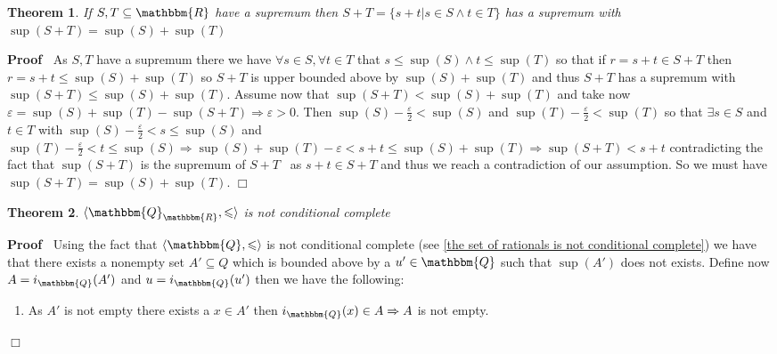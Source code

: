 \documentclass{book}
\newenvironment{proof}{\noindent\textbf{Proof\ }}{\hspace*{\fill}$\Box$\medskip}
\newtheorem{theorem}{Theorem}
\begin{document}
{{\begin{theorem}
  \label{sup(S+T)}If $S, T \subseteq \mathbbm{R}$ have a supremum then $S + T
  = \{ s + t|s \in S \wedge t \in T \}$ has a supremum with $\sup (S + T) =
  \sup (S) + \sup (T)$
\end{theorem}

\begin{proof}
  As $S, T$ have a supremum there we have $\forall s \in S, \forall t \in T$
  that $s \leqslant \sup (S) \wedge t \leqslant \sup (T)$ so that if $r = s +
  t \in S + T$ then $r = s + t \leqslant \sup (S) + \sup (T)$ so $S + T$ is
  upper bounded above by $\sup (S) + \sup (T)$ and thus $S + T$ has a supremum
  with $\sup (S + T) \leqslant \sup (S) + \sup (T)$. Assume now that $\sup (S
  + T) < \sup (S) + \sup (T)$ and take now $\varepsilon = \sup (S) + \sup (T)
  - \sup (S + T) \Rightarrow \varepsilon > 0$. Then $\sup (S) -
  \frac{\varepsilon}{2} < \sup (S)$ and $\sup (T) - \frac{\varepsilon}{2} <
  \sup (T)$ so that $\exists s \in S$ and $t \in T$ with $\sup (S) -
  \frac{\varepsilon}{2} < s \leqslant \sup (S)$ and $\sup (T) -
  \frac{\varepsilon}{2} < t \leqslant \sup (S) \Rightarrow \sup (S) + \sup (T)
  - \varepsilon < s + t \leqslant \sup (S) + \sup (T) \Rightarrow \sup (S + T)
  < s + t$ contradicting the fact that $\sup (S + T)$ is the supremum of $S +
  T$ \ as $s + t \in S + T$ and thus we reach a contradiction of our
  assumption. So we must have $\sup (S + T) = \sup (S) + \sup (T)$.
\end{proof}

\begin{theorem}
  \label{rationals embedded in the reals are not conditional complete}$\langle
  \mathbbm{Q}_{\mathbbm{R}}, \leqslant \rangle$ is not conditional complete
\end{theorem}

\begin{proof}
  Using the fact that $\langle \mathbbm{Q}, \leqslant \rangle$ is not
  conditional complete (see \ref{the set of rationals is not conditional
  complete}) we have that there exists a nonempty set $A' \subseteq Q$ which
  is bounded above by a $u' \in \mathbbm{Q}$ such that $\sup (A')$ does not
  exists. Define now $A = i_{\mathbbm{Q}} (A')$ and $u = i_{\mathbbm{Q}} (u')$
  then we have the following:
  \begin{enumerate}
    \item As $A'$ is not empty there exists a $x \in A'$ then $i_{\mathbbm{Q}}
    (x) \in A \Rightarrow A$ is not empty.
    

\end{enumerate}
\end{proof}}}
\end{document}
